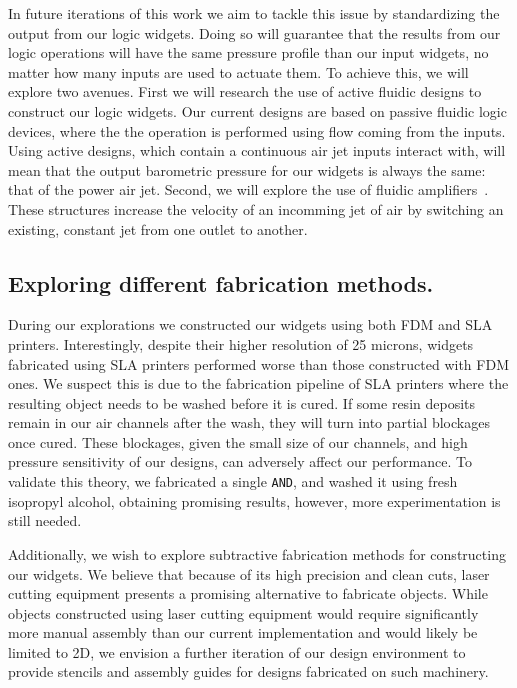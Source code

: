         In future iterations of this work we aim to tackle this issue by
        standardizing the output from our logic widgets. Doing so will
        guarantee that the results from our logic operations will have the
        same pressure profile than our input widgets, no matter how many
        inputs are used to actuate them. To achieve this, we will explore
        two avenues. First we will research the use of active fluidic
        designs to construct our logic widgets. Our current designs are
        based on passive fluidic logic devices, where the the operation is
        performed using flow coming from the inputs. Using active designs, which
        contain a continuous air jet inputs interact with, will mean that the
        output barometric pressure for our widgets is always the same: that of
        the power air jet. Second, we will explore the use of fluidic
        amplifiers~\cite{CharlesBelsterling:1971}.  These structures increase
        the velocity of an incomming jet of air by switching an existing,
        constant jet from one outlet to another.
        
      \subsection{Exploring different fabrication methods.} 
        During our explorations we constructed our widgets using both FDM
        and SLA printers. Interestingly, despite their higher resolution of
        25 microns, widgets fabricated using SLA printers performed worse
        than those constructed with FDM ones. We suspect this is due to the
        fabrication pipeline of SLA printers where the resulting object
        needs to be washed before it is cured. If some resin deposits remain in
        our air channels after the wash, they will turn into partial
        blockages once cured. These blockages, given the small size of our
        channels, and high pressure sensitivity of our designs, can
        adversely affect our performance. To validate this theory, we
        fabricated a single \texttt{AND}, and washed it using fresh
        isopropyl alcohol, obtaining promising results, however, more
        experimentation is still needed.

        Additionally, we wish to explore subtractive fabrication methods for
        constructing our widgets. We believe that because of its high precision
        and clean cuts, laser cutting equipment presents a promising alternative
        to fabricate \al objects. While \al objects constructed using laser
        cutting equipment would require significantly more manual assembly than
        our current implementation and would likely be limited to 2D, we
        envision a further iteration of our design environment to provide
        stencils and assembly guides for \al designs fabricated on such
        machinery.
        
